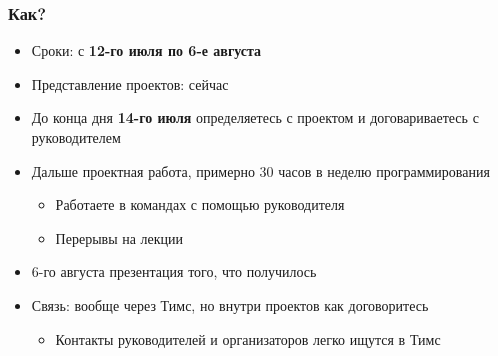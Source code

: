 \documentclass[xetex,mathserif,serif]{beamer}
\begin{document}
    \begin{frame}
        \frametitle{Как?}
        \begin{itemize}
            \item Сроки: с \textbf{12-го июля по 6-е августа}
            \item Представление проектов: сейчас
            \item До конца дня \textbf{14-го июля} определяетесь с проектом и договариваетесь с руководителем
            \item Дальше проектная работа, примерно 30 часов в неделю программирования
            \begin{itemize}
                \item Работаете в командах с помощью руководителя
                \item Перерывы на лекции
            \end{itemize}
            \item 6-го августа презентация того, что получилось
            \item Связь: вообще через Тимс, но внутри проектов как договоритесь
            \begin{itemize}
                \item Контакты руководителей и организаторов легко ищутся в Тимс
            \end{itemize}
        \end{itemize}
    \end{frame}
\end{document}

